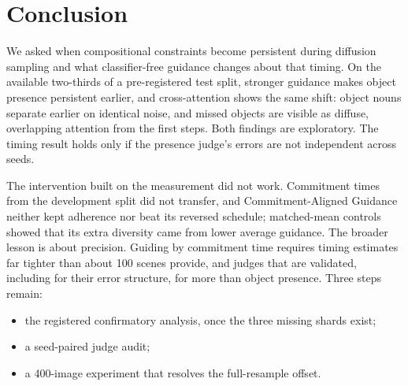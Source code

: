 \section{Conclusion}
We asked when compositional constraints become persistent during diffusion sampling and what classifier-free guidance changes about that timing. On the available two-thirds of a pre-registered test split, stronger guidance makes object presence persistent earlier, and cross-attention shows the same shift: object nouns separate earlier on identical noise, and missed objects are visible as diffuse, overlapping attention from the first steps. Both findings are exploratory. The timing result holds only if the presence judge's errors are not independent across seeds.

The intervention built on the measurement did not work. Commitment times from the development split did not transfer, and Commitment-Aligned Guidance neither kept adherence nor beat its reversed schedule; matched-mean controls showed that its extra diversity came from lower average guidance. The broader lesson is about precision. Guiding by commitment time requires timing estimates far tighter than about 100 scenes provide, and judges that are validated, including for their error structure, for more than object presence. Three steps remain:
\begin{itemize}
\item the registered confirmatory analysis, once the three missing shards exist;
\item a seed-paired judge audit;
\item a 400-image experiment that resolves the full-resample offset.
\end{itemize}
